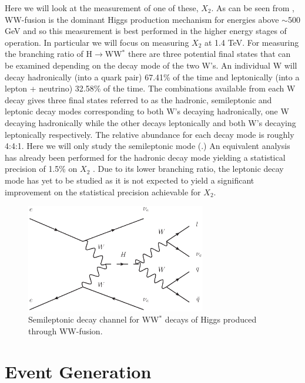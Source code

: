 Here we will look at the measurement of one of these, $X_2$. As can be seen from , WW-fusion is the dominant Higgs production mechanism for energies above $\sim $500 GeV and so this measurement is best performed in the higher energy stages of operation. In particular we will focus on measuring $X_2$ at 1.4 TeV. For measuring the branching ratio of H$\rightarrow$WW$^*$ there are three potential final states that can be examined depending on the decay mode of the two W's. An individual W will decay hadronically (into a quark pair) 67.41\% of the time and leptonically (into a lepton + neutrino) 32.58\% of the time.  The combinations available from each W decay gives three final states referred to as the hadronic, semileptonic and leptonic decay modes corresponding to both W's decaying hadronically, one W decaying hadronically while the other decays leptonically and both W's decaying leptonically respectively. The relative abundance for each decay mode is roughly 4:4:1. Here we will only study the semileptonic mode (.) An equivalent analysis has already been performed for the hadronic decay mode yielding a statistical precision of 1.5\% on $X_2$ \cite{Abramowicz:2016zbo}. Due to its lower branching ratio, the leptonic decay mode has yet to be studied as it is not expected to yield a significant improvement on the statistical precision achievable for $X_2$. 

\begin{figure}
  \centering
  \includegraphics[width=0.7\textwidth,keepaspectratio]{HiggsAnalysis/figures/HiggsFeynman.eps}
  \caption[Semileptonic decay channel for  WW$^*$ decays of Higgs produced through WW-fusion]{Semileptonic decay channel for  WW$^*$ decays of Higgs produced through WW-fusion.}
  \label{fig:semileptonic}
\end{figure}

\section{Event Generation}

